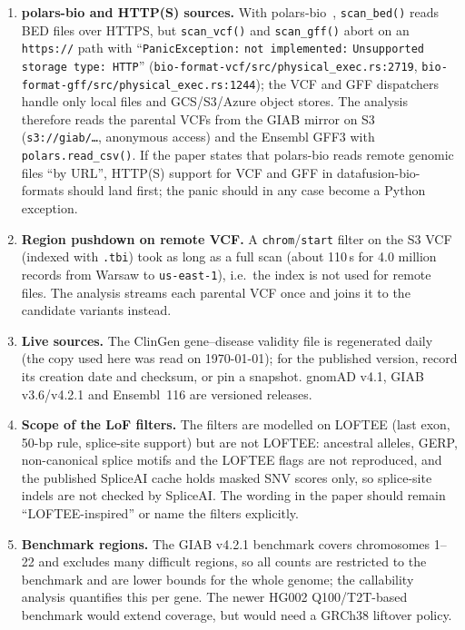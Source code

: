 \begin{enumerate}
\item \textbf{polars-bio and HTTP(S) sources.} With polars-bio~\PolarsBioVersion{},
  \texttt{scan\_bed()} reads BED files over HTTPS, but \texttt{scan\_vcf()} and
  \texttt{scan\_gff()} abort on an \texttt{https://} path with
  ``\texttt{PanicException:} \texttt{not implemented:} \texttt{Unsupported storage type: HTTP}'' 
  (\nolinkurl{bio-format-vcf/src/physical_exec.rs:2719},
  \nolinkurl{bio-format-gff/src/physical_exec.rs:1244}); the VCF and GFF
  dispatchers handle only local files and GCS/S3/Azure object stores. The
  analysis therefore reads the parental VCFs from the GIAB mirror on S3
  (\texttt{s3://giab/\ldots}, anonymous access) and the Ensembl GFF3 with
  \texttt{polars.read\_csv()}. If the paper states that polars-bio reads
  remote genomic files ``by URL'', HTTP(S) support for VCF and GFF in
  datafusion-bio-formats should land first; the panic should in any case
  become a Python exception.
\item \textbf{Region pushdown on remote VCF.} A
  \texttt{chrom}/\texttt{start} filter on the S3 VCF (indexed with
  \texttt{.tbi}) took as long as a full scan (about 110\,s for 4.0 million
  records from Warsaw to \texttt{us-east-1}), i.e.\ the index is not used for
  remote files. The analysis streams each parental VCF once and joins it to
  the candidate variants instead.
\item \textbf{Live sources.} The ClinGen gene--disease validity file is
  regenerated daily (the copy used here was read on \today); for the
  published version, record its creation date and checksum, or pin a snapshot.
  gnomAD v4.1, GIAB v3.6/v4.2.1 and Ensembl~116 are versioned releases.
\item \textbf{Scope of the LoF filters.} The filters are modelled on LOFTEE
  (last exon, 50-bp rule, splice-site support) but are not LOFTEE: ancestral
  alleles, GERP, non-canonical splice motifs and the LOFTEE flags are not
  reproduced, and the published SpliceAI cache holds masked SNV scores only,
  so splice-site indels are not checked by SpliceAI. The wording in the paper
  should remain ``LOFTEE-inspired'' or name the filters explicitly.
\item \textbf{Benchmark regions.} The GIAB v4.2.1 benchmark covers chromosomes
  1--22 and excludes many difficult regions, so all counts are restricted to
  the benchmark and are lower bounds for the whole genome; the callability
  analysis quantifies this per gene. The newer HG002 Q100/T2T-based
  benchmark would extend coverage, but would need a GRCh38 liftover policy.

\end{enumerate}
